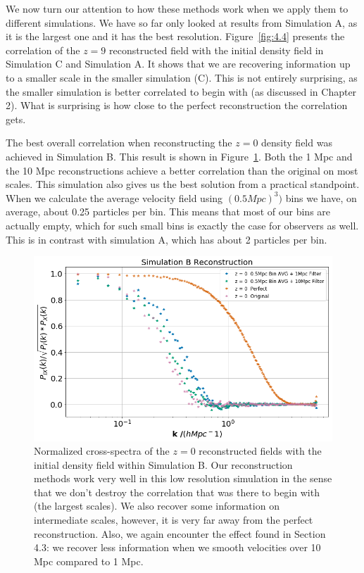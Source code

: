 We now turn our attention to how these methods work when we apply them to different simulations. We have so far only looked at results from Simulation A, as it is the largest one and it has the best resolution. Figure~\ref{fig:4.4} presents the correlation of the $z=9$ reconstructed field with the initial density field in Simulation C and Simulation A. It shows that we are recovering information up to a smaller scale in the smaller simulation (C). This is not entirely surprising, as the smaller simulation is better correlated to begin with (as discussed in Chapter 2). What is surprising is how close to the perfect reconstruction the correlation gets.

The best overall correlation when reconstructing the $z=0$ density field was achieved in Simulation B. This result is shown in Figure~\ref{fig:4.5}. Both the 1 Mpc and the 10 Mpc reconstructions achieve a better correlation than the original on most scales. This simulation also gives us the best solution from a practical standpoint. When we calculate the average velocity field using $(0.5 Mpc)^3)$ bins we have, on average, about 0.25 particles per bin. This means that most of our bins are actually empty, which for such small bins is exactly the case for observers as well. This is in contrast with simulation A, which has about 2 particles per bin.

\begin{figure}
    \centering
    \includegraphics[width=1\columnwidth]{images/realRecon/simBRecon.png}%
    
    \caption{
        Normalized cross-spectra of the $z=0$ reconstructed fields with the initial density field within Simulation B. Our reconstruction methods work very well in this low resolution simulation in the sense that we don't destroy the correlation that was there to begin with (the largest scales). We also recover some information on intermediate scales, however, it is very far away from the perfect reconstruction. Also, we again encounter the effect found in Section 4.3: we recover less information when we smooth velocities over 10 Mpc compared to 1 Mpc. 
    }
    
    \label{fig:4.5}
\end{figure}

